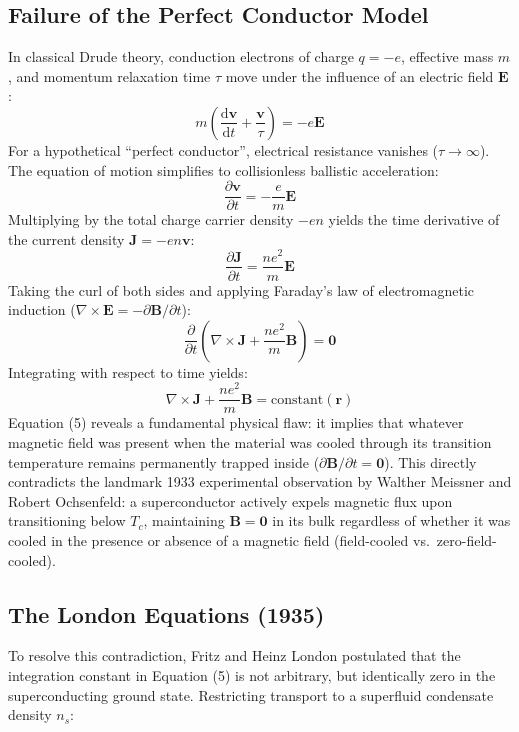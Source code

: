 \documentclass[11pt,a4paper]{article}
\begin{document}
\subsection{Failure of the Perfect Conductor Model}
In classical Drude theory, conduction electrons of charge $q = -e$, effective mass $m$, and momentum relaxation time $\tau$ move under the influence of an electric field $\mathbf{E}$:
\begin{equation}
    m \left( \frac{\mathrm{d}\mathbf{v}}{\mathrm{d}t} + \frac{\mathbf{v}}{\tau} \right) = -e \mathbf{E}
\end{equation}
For a hypothetical ``perfect conductor'', electrical resistance vanishes ($\tau \to \infty$). The equation of motion simplifies to collisionless ballistic acceleration:
\begin{equation}
    \frac{\partial \mathbf{v}}{\partial t} = -\frac{e}{m} \mathbf{E}
\end{equation}
Multiplying by the total charge carrier density $-e n$ yields the time derivative of the current density $\mathbf{J} = -e n \mathbf{v}$:
\begin{equation}
    \frac{\partial \mathbf{J}}{\partial t} = \frac{n e^2}{m} \mathbf{E}
\end{equation}
Taking the curl of both sides and applying Faraday's law of electromagnetic induction ($\nabla \times \mathbf{E} = -\partial \mathbf{B}/\partial t$):
\begin{equation}
    \frac{\partial}{\partial t} \left( \nabla \times \mathbf{J} + \frac{n e^2}{m} \mathbf{B} \right) = \mathbf{0}
\end{equation}
Integrating with respect to time yields:
\begin{equation}
    \nabla \times \mathbf{J} + \frac{n e^2}{m} \mathbf{B} = \text{constant}(\mathbf{r})
\end{equation}
Equation (5) reveals a fundamental physical flaw: it implies that whatever magnetic field was present when the material was cooled through its transition temperature remains permanently trapped inside ($\partial \mathbf{B}/\partial t = \mathbf{0}$). This directly contradicts the landmark 1933 experimental observation by Walther Meissner and Robert Ochsenfeld: a superconductor actively expels magnetic flux upon transitioning below $T_c$, maintaining $\mathbf{B} = \mathbf{0}$ in its bulk regardless of whether it was cooled in the presence or absence of a magnetic field (field-cooled vs.\ zero-field-cooled).

\subsection{The London Equations (1935)}
To resolve this contradiction, Fritz and Heinz London postulated that the integration constant in Equation (5) is not arbitrary, but identically zero in the superconducting ground state. Restricting transport to a superfluid condensate density $n_s$:
\end{document}
